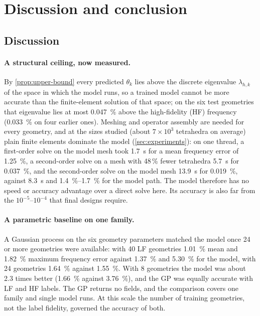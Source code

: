 \section{Discussion and conclusion}\label{sec:discussion}

\subsection{Discussion}\label{sec:08-discussion}

\paragraph{A structural ceiling, now measured.}
By \cref{prop:upper-bound} every predicted $\theta_k$ lies above the discrete eigenvalue $\lambda_{h,k}$ of the space in which the model runs, so a trained model cannot be more accurate than the finite-element solution of that space; on the six test geometries that eigenvalue lies at most \SI{0.047}{\percent} above the high-fidelity (HF) frequency (\SI{0.033}{\percent} on four earlier ones). %
Meshing and operator assembly are needed for every geometry, and at the sizes studied (about $7\times10^3$ tetrahedra on average) plain finite elements dominate the model (\cref{sec:experiments}): %
on one thread, a first-order solve on the model mesh took \SI{1.7}{s} for a mean frequency error of \SI{1.25}{\percent}, a second-order solve on a mesh with 48\,\% fewer tetrahedra \SI{5.7}{s} for \SI{0.037}{\percent}, and the second-order solve on the model mesh \SI{13.9}{s} for \SI{0.019}{\percent}, against \SI{8.3}{s} and \SIrange{1.4}{1.7}{\percent} for the model path. %
The model therefore has no speed or accuracy advantage over a direct solve here. %
Its accuracy is also far from the $10^{-5}$--$10^{-4}$ that final designs require. %

\paragraph{A parametric baseline on one family.}
A Gaussian process on the six geometry parameters matched the model once 24 or more geometries were available: with 40 LF geometries \SI{1.01}{\percent} mean and \SI{1.82}{\percent} maximum frequency error against \SI{1.37}{\percent} and \SI{5.30}{\percent} for the model, with 24 geometries \SI{1.64}{\percent} against \SI{1.55}{\percent}. %
With 8 geometries the model was about 2.3 times better (\SI{1.66}{\percent} against \SI{3.76}{\percent}), and the GP was equally accurate with LF and HF labels. %
The GP returns no fields, and the comparison covers one family and single model runs.
At this scale the number of training geometries, not the label fidelity, governed the accuracy of both.

